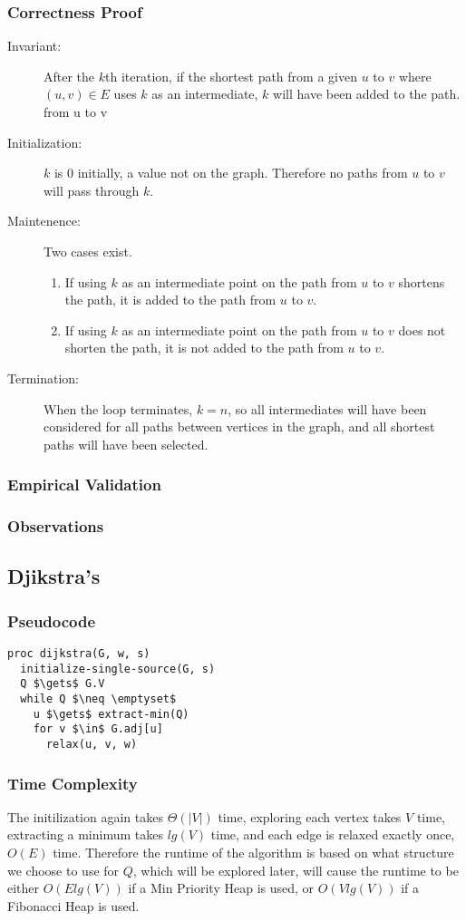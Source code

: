 \documentclass[a4paper,12pt]{article}
\begin{document}
\subsubsection{Correctness Proof}
\begin{description}
\item [Invariant: ] After the $k$th iteration, if the shortest path from a given $u$ to $v$ where $(u,v)\in E$ uses $k$ as an intermediate, $k$ will have been added to the path.
  from u to v
\item [Initialization: ] $k$ is 0 initially, a value not on the graph. Therefore no paths from $u$ to $v$ will pass through $k$.
\item [Maintenence: ] Two cases exist.
  \begin{enumerate}
  \item If using $k$ as an intermediate point on the path from $u$ to $v$ shortens the path, it is added to the path from $u$ to $v$.
  \item If using $k$ as an intermediate point on the path from $u$ to $v$ does not shorten the path, it is not added to the path from $u$ to $v$.
  \end{enumerate}
\item [Termination: ] When the loop terminates, $k = n$, so all intermediates will have been considered for all paths between vertices in the graph, and all shortest
  paths will have been selected.
\end{description}
\subsubsection{Empirical Validation}
\subsubsection{Observations}
\subsection{Djikstra's}
\subsubsection{Pseudocode}
\begin{lstlisting}[mathescape=true]
proc dijkstra(G, w, s)
  initialize-single-source(G, s)
  Q $\gets$ G.V
  while Q $\neq \emptyset$
    u $\gets$ extract-min(Q)
    for v $\in$ G.adj[u]
      relax(u, v, w)
\end{lstlisting}
\subsubsection{Time Complexity}
The initilization again takes $\Theta(|V|)$ time, exploring each vertex takes $V$ time, extracting a minimum takes $lg(V)$ time, and each edge is relaxed exactly once, $O(E)$ time. Therefore the runtime of the algorithm is based on what structure we choose to use for $Q$, which will be explored later, will cause the runtime to be either $O(Elg(V))$ if a Min Priority Heap is used, or $O(Vlg(V))$ if a Fibonacci Heap is used.
\end{document}
